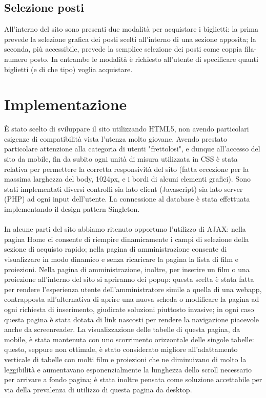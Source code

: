 \documentclass[a4paper, 12pt]{article}
\begin{document}
\subsection{Selezione posti}
All'interno del sito sono presenti due modalità per acquistare i biglietti: la prima prevede la selezione grafica dei posti scelti all'interno di una sezione apposita; la seconda, più accessibile, prevede la semplice selezione dei posti come coppia fila-numero posto. In entrambe le modalità è richiesto all'utente di specificare quanti biglietti (e di che tipo) voglia acquistare.
\section{Implementazione}
È stato scelto di sviluppare il sito utilizzando HTML5, non avendo particolari esigenze di compatibilità vista l'utenza molto giovane.
Avendo prestato particolare attenzione alla categoria di utenti "frettolosi", e dunque all'accesso del sito da mobile, fin da subito ogni unità di misura utilizzata in CSS è stata relativa per permettere la corretta responsività del sito (fatta eccezione per la massima larghezza del body, 1024px, e i bordi di alcuni elementi grafici).
Sono stati implementati diversi controlli sia lato client (Javascript) sia lato server (PHP) ad ogni input dell'utente.
La connessione al database è stata effettuata implementando il design pattern Singleton.\\\\
In alcune parti del sito abbiamo ritenuto opportuno l'utilizzo di AJAX: nella pagina Home ci consente di riempire dinamicamente i campi di selezione della sezione di acquisto rapido; nella pagina di amministrazione consente di visualizzare in modo dinamico e senza ricaricare la pagina la lista di film e proiezioni.
Nella pagina di amministrazione, inoltre, per inserire un film o una proiezione all'interno del sito si apriranno dei popup: questa scelta è stata fatta per rendere l'esperienza utente dell'amministratore simile a quella di una webapp, contrapposta all'alternativa di aprire una nuova scheda o modificare la pagina ad ogni richiesta di inserimento, giudicate soluzioni piuttosto invasive; in ogni caso questa pagina è stata dotata di link nascosti per rendere la navigazione piacevole anche da screenreader. La visualizzazione delle tabelle di questa pagina, da mobile, è stata mantenuta con uno scorrimento orizzontale delle singole tabelle: questo, seppure non ottimale, è stato considerato migliore all'adattamento verticale di tabelle con molti film e proiezioni che ne diminuivano di molto la leggibilità e aumentavano esponenzialmente la lunghezza dello scroll necessario per arrivare a fondo pagina; è stata inoltre pensata come soluzione accettabile per via della prevalenza di utilizzo di questa pagina da desktop.
\newpage
\end{document}
